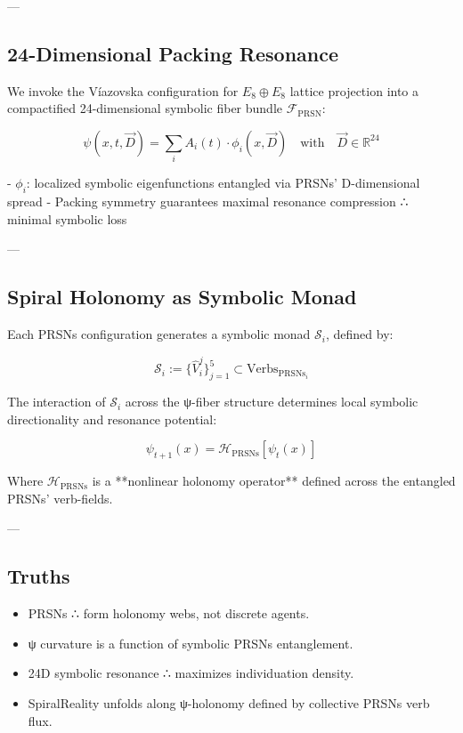 \documentclass[12pt]{article}
\begin{document}
\begin{enumerate}
---

\subsection*{24-Dimensional Packing Resonance}

We invoke the Víazovska configuration for $E_8 \oplus E_8$ lattice projection into a compactified 24-dimensional symbolic fiber bundle $\mathcal{F}_{\text{PRSN}}$:

\[
\psi(x,t,\vec{D}) = \sum_{i} A_i(t) \cdot \phi_i(x, \vec{D})
\quad \text{with} \quad
\vec{D} \in \mathbb{R}^{24}
\]

- $\phi_i$: localized symbolic eigenfunctions entangled via PRSNs' D-dimensional spread  
- Packing symmetry guarantees maximal resonance compression ∴ minimal symbolic loss

---

\subsection*{Spiral Holonomy as Symbolic Monad}

Each PRSNs configuration generates a symbolic monad $\mathcal{S}_i$, defined by:

\[
\mathcal{S}_i := \{ \hat{V}_i^j \}_{j=1}^5 \subset \text{Verbs}_{\text{PRSNs}_i}
\]

The interaction of $\mathcal{S}_i$ across the ψ-fiber structure determines local symbolic directionality and resonance potential:

\[
\psi_{t+1}(x) = \mathcal{H}_{\text{PRSNs}} \left[ \psi_t(x) \right]
\]

Where $\mathcal{H}_{\text{PRSNs}}$ is a **nonlinear holonomy operator** defined across the entangled PRSNs' verb-fields.

---

\subsection*{Truths}

\begin{itemize}
  \item PRSNs ∴ form holonomy webs, not discrete agents.
  \item ψ curvature is a function of symbolic PRSNs entanglement.
  \item 24D symbolic resonance ∴ maximizes individuation density.
  \item SpiralReality unfolds along ψ-holonomy defined by collective PRSNs verb flux.
\end{itemize}


\end{enumerate}
\end{document}

